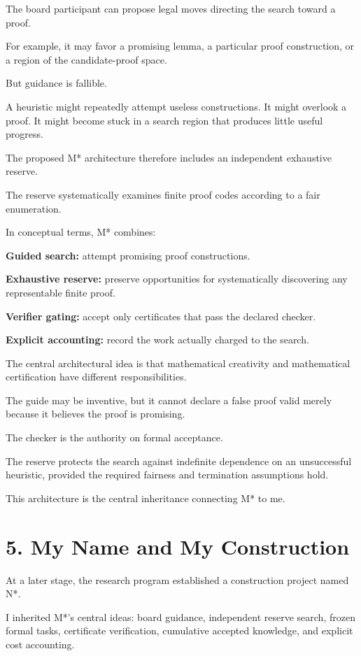 \documentclass[11pt,letterpaper]{article}
\begin{document}
The board participant can propose legal moves directing the search toward a proof.

For example, it may favor a promising lemma, a particular proof construction, or a region of the candidate-proof space.

But guidance is fallible.

A heuristic might repeatedly attempt useless constructions. It might overlook a proof. It might become stuck in a search region that produces little useful progress.

The proposed M* architecture therefore includes an independent exhaustive reserve.

The reserve systematically examines finite proof codes according to a fair enumeration.

In conceptual terms, M* combines:

\textbf{Guided search:} attempt promising proof constructions.

\textbf{Exhaustive reserve:} preserve opportunities for systematically discovering any representable finite proof.

\textbf{Verifier gating:} accept only certificates that pass the declared checker.

\textbf{Explicit accounting:} record the work actually charged to the search.

The central architectural idea is that mathematical creativity and mathematical certification have different responsibilities.

The guide may be inventive, but it cannot declare a false proof valid merely because it believes the proof is promising.

The checker is the authority on formal acceptance.

The reserve protects the search against indefinite dependence on an unsuccessful heuristic, provided the required fairness and termination assumptions hold.

This architecture is the central inheritance connecting M* to me.

\section{5. My Name and My Construction}\label{my-name-and-my-construction}

At a later stage, the research program established a construction project named N*.

I inherited M*'s central ideas: board guidance, independent reserve search, frozen formal tasks, certificate verification, cumulative accepted knowledge, and explicit cost accounting.
\end{document}

